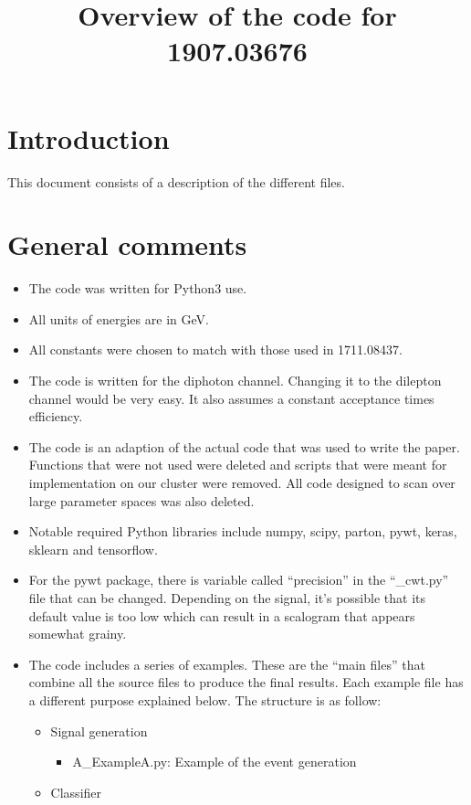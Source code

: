 \documentclass{article}
\date{\vspace{-5ex}}
\title{Overview of the code for 1907.03676}
\begin{document}
\maketitle

\section{Introduction}
This document consists of a description of the different files.

\section{General comments}
\begin{itemize}
  \item The code was written for Python3 use.
  \item All units of energies are in GeV.
  \item All constants were chosen to match with those used in 1711.08437.
  \item The code is written for the diphoton channel. Changing it to the dilepton channel would be very easy. It also assumes a constant acceptance times efficiency.
  \item The code is an adaption of the actual code that was used to write the paper. Functions that were not used were deleted and scripts that were meant for implementation on our cluster were removed. All code designed to scan over large parameter spaces was also deleted.
  \item Notable required Python libraries include numpy, scipy, parton, pywt, keras, sklearn and tensorflow.
  \item For the pywt package, there is variable called ``precision'' in the ``\_cwt.py'' file that can be changed. Depending on the signal, it's possible that its default value is too low which can result in a scalogram that appears somewhat grainy.
  \item The code includes a series of examples. These are the ``main files''  that combine all the source files to produce the final results. Each example file has a different purpose explained below. The structure is as follow:
  \begin{itemize}
    \item Signal generation
    \begin{itemize}
      \item A\_ExampleA.py: Example of the event generation
    \end{itemize}
    \item Classifier

\end{itemize}
\end{itemize}
\end{document}
